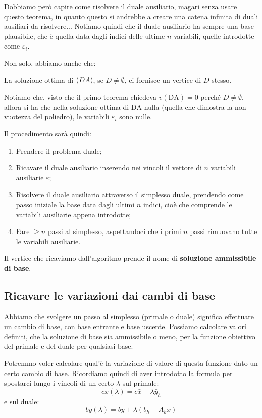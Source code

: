 \documentclass[a4paper,11pt]{article}
\begin{document}
Dobbiamo però capire come risolvere il duale ausiliario, magari senza usare questo teorema, in quanto questo si andrebbe a creare una catena infinita di duali ausiliari da risolvere...
Notiamo quindi che il duale ausiliario ha sempre una base plausibile, che è quella data dagli indici delle ultime $n$ variabili, quelle introdotte come $\varepsilon_i$.

Non solo, abbiamo anche che:
\begin{theorem}{}
	La soluzione ottima di $\text(DA)$, se $D \neq \emptyset$, ci fornisce un vertice di $D$ stesso.
\end{theorem}
Notiamo che, visto che il primo teorema chiedeva $v(\text{DA}) = 0$ perché $D \neq \emptyset$, allora si ha che nella soluzione ottima di $\text{DA}$ nulla (quella che dimostra la non vuotezza del poliedro), le variabili $\varepsilon_i$ sono nulle.

Il procedimento sarà quindi:
\begin{enumerate}
	\item Prendere il problema duale;
	\item Ricavare il duale ausiliario inserendo nei vincoli il vettore di $n$ variabili ausiliarie $\varepsilon$;
	\item Risolvere il duale ausiliario attraverso il simplesso duale, prendendo come passo iniziale la base data dagli ultimi $n$ indici, cioè che comprende le variabili ausiliarie appena introdotte;
	\item Fare $\geq n$ passi al simplesso, aspettandoci che i primi $n$ passi rimuovano tutte le variabili ausiliarie.
\end{enumerate}

Il vertice che ricaviamo dall'algoritmo prende il nome di \textbf{soluzione ammissibile di base}.

\subsection{Ricavare le variazioni dai cambi di base}
Abbiamo che svolgere un passo al simplesso (primale o duale) significa effettuare un cambio di base, con base entrante e base uscente.
Possiamo calcolare valori definiti, che la soluzione di base sia ammissibile o meno, per la funzione obiettivo del primale e del duale per qualsiasi base.

Potremmo voler calcolare qual'è la variazione di valore di questa funzione dato un certo cambio di base.
Ricordiamo quindi di aver introdotto la formula per spostarci lungo i vincoli di un certo $\lambda$ sul primale:
$$
cx(\lambda) = c\bar{x} - \lambda\bar{y}_h
$$
e sul duale:
$$
by(\lambda) = b\bar{y} + \lambda\left( b_h - A_k \bar{x} \right)
$$
\end{document}
